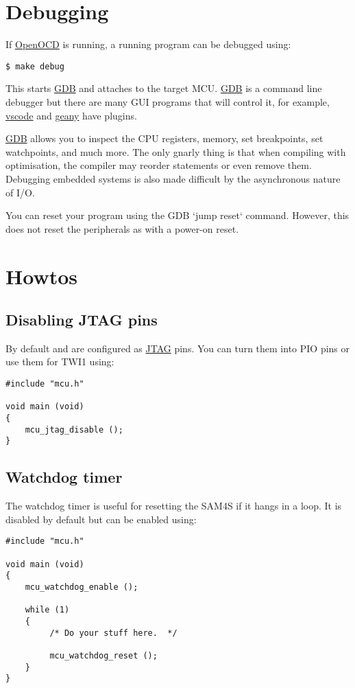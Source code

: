 \section{Debugging}
\label{debugging}

If \url{OpenOCD} is running, a running program can be debugged using:

\begin{verbatim}
$ make debug
\end{verbatim}

This starts \url{GDB} and attaches to the target MCU. \url{GDB} is a
command line debugger but there are many GUI programs that will control
it, for example, \url{vscode} and \url{geany} have plugins.

\url{GDB} allows you to inspect the CPU registers, memory, set
breakpoints, set watchpoints, and much more. The only gnarly thing is
that when compiling with optimisation, the compiler may reorder
statements or even remove them. Debugging embedded systems is also made
difficult by the asynchronous nature of I/O.

You can reset your program using the GDB `jump reset` command. However,
this does not reset the peripherals as with a power-on reset.

\section{Howtos}
\label{howtos}

\subsection{Disabling JTAG pins}
\label{disabling-jtag-pins}

By default  and  are configured as \url{JTAG} pins. You can turn
them into PIO pins or use them for TWI1 using:
%
\begin{verbatim}
#include "mcu.h"

void main (void)
{
    mcu_jtag_disable ();
}
\end{verbatim}

\subsection{Watchdog timer}
\label{watchdog-timer}

The watchdog timer is useful for resetting the SAM4S if it hangs in a
loop.  It is disabled by default but can be enabled using:
%
\begin{verbatim}
#include "mcu.h"

void main (void)
{
    mcu_watchdog_enable ();
   
    while (1)
    {
         /* Do your stuff here.  */

         mcu_watchdog_reset ();
    }
}
\end{verbatim}

